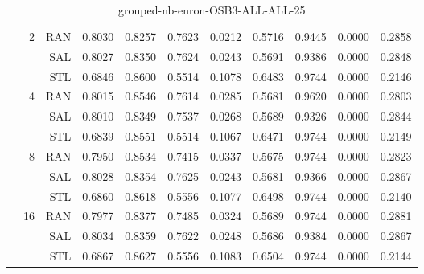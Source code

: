\begin{center}
\begin{table}[htbp]
\begin{tabular}{ | r | r | r | r | r | r | r | r | r | r | r |}
 & \multirow{3}{*}{2} & RAN & 0.8030 & 0.8257 & 0.7623 & 0.0212 & 0.5716 & 0.9445 & 0.0000 & 0.2858\\ \cline{3-11}
 &   & SAL & 0.8027 & 0.8350 & 0.7624 & 0.0243 & 0.5691 & 0.9386 & 0.0000 & 0.2848\\ \cline{3-11}
 &   & STL & 0.6846 & 0.8600 & 0.5514 & 0.1078 & 0.6483 & 0.9744 & 0.0000 & 0.2146\\ \cline{2-11}
 & \multirow{3}{*}{4} & RAN & 0.8015 & 0.8546 & 0.7614 & 0.0285 & 0.5681 & 0.9620 & 0.0000 & 0.2803\\ \cline{3-11}
 &   & SAL & 0.8010 & 0.8349 & 0.7537 & 0.0268 & 0.5689 & 0.9326 & 0.0000 & 0.2844\\ \cline{3-11}
 &   & STL & 0.6839 & 0.8551 & 0.5514 & 0.1067 & 0.6471 & 0.9744 & 0.0000 & 0.2149\\ \cline{2-11}
 & \multirow{3}{*}{8} & RAN & 0.7950 & 0.8534 & 0.7415 & 0.0337 & 0.5675 & 0.9744 & 0.0000 & 0.2823\\ \cline{3-11}
 &   & SAL & 0.8028 & 0.8354 & 0.7625 & 0.0243 & 0.5681 & 0.9366 & 0.0000 & 0.2867\\ \cline{3-11}
 &   & STL & 0.6860 & 0.8618 & 0.5556 & 0.1077 & 0.6498 & 0.9744 & 0.0000 & 0.2140\\ \cline{2-11}
 & \multirow{3}{*}{16} & RAN & 0.7977 & 0.8377 & 0.7485 & 0.0324 & 0.5689 & 0.9744 & 0.0000 & 0.2881\\ \cline{3-11}
 &   & SAL & 0.8034 & 0.8359 & 0.7622 & 0.0248 & 0.5686 & 0.9384 & 0.0000 & 0.2867\\ \cline{3-11}
 &   & STL & 0.6867 & 0.8627 & 0.5556 & 0.1083 & 0.6504 & 0.9744 & 0.0000 & 0.2144\\ \cline{2-11}
\hline
\end{tabular}
\caption{grouped-nb-enron-OSB3-ALL-ALL-25}
\end{table}
\end{center}

